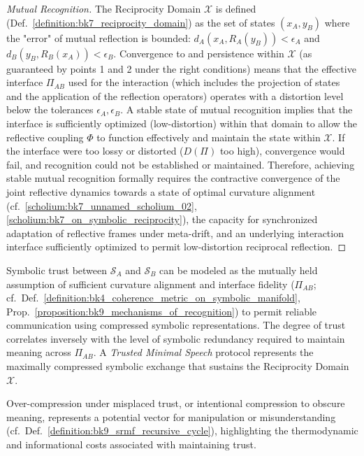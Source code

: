 \begin{proof}[Mutual Recognition]
The Reciprocity Domain $\mathcal{X}$ is defined (Def.~\ref{definition:bk7_reciprocity_domain}) as the set of states $(x_A, y_B)$ where the "error" of mutual reflection is bounded: $d_A(x_A, R_A(y_B)) < \epsilon_A$ and $d_B(y_B, R_B(x_A)) < \epsilon_B$. Convergence to and persistence within $\mathcal{X}$ (as guaranteed by points 1 and 2 under the right conditions) means that the effective interface $\Pi_{AB}$ used for the interaction (which includes the projection of states and the application of the reflection operators) operates with a distortion level below the tolerances $\epsilon_A, \epsilon_B$. A stable state of mutual recognition implies that the interface is sufficiently optimized (low-distortion) within that domain to allow the reflective coupling $\Phi$ to function effectively and maintain the state within $\mathcal{X}$. If the interface were too lossy or distorted ($D(\Pi)$ too high), convergence would fail, and recognition could not be established or maintained.
Therefore, achieving stable mutual recognition formally requires the contractive convergence of the joint reflective dynamics towards a state of optimal curvature alignment (cf.~\ref{scholium:bk7_unnamed_scholium_02}, \ref{scholium:bk7_on_symbolic_reciprocity}), the capacity for synchronized adaptation of reflective frames under meta-drift, and an underlying interaction interface sufficiently optimized to permit low-distortion reciprocal reflection.
\end{proof}
\begin{definition}
\label{definition:bk9_symbolic_trust_as_compression_protocol}
Symbolic trust between $\mathcal{S}_A$ and $\mathcal{S}_B$ can be modeled as the mutually held assumption of sufficient curvature alignment and interface fidelity ($\Pi_{AB}$; cf.~Def.~\ref{definition:bk4_coherence_metric_on_symbolic_manifold}, Prop.~\ref{proposition:bk9_mechanisms_of_recognition}) to permit reliable communication using compressed symbolic representations. The degree of trust correlates inversely with the level of symbolic redundancy required to maintain meaning across $\Pi_{AB}$. A \emph{Trusted Minimal Speech} protocol represents the maximally compressed symbolic exchange that sustains the Reciprocity Domain $\mathcal{X}$.
\end{definition}
\begin{remark}
\label{remark:bk9_vectors_of_manipulation}
Over-compression under misplaced trust, or intentional compression to obscure meaning, represents a potential vector for manipulation or misunderstanding (cf.~Def.~\ref{definition:bk9_srmf_recursive_cycle}), highlighting the thermodynamic and informational costs associated with maintaining trust.
\end{remark}
